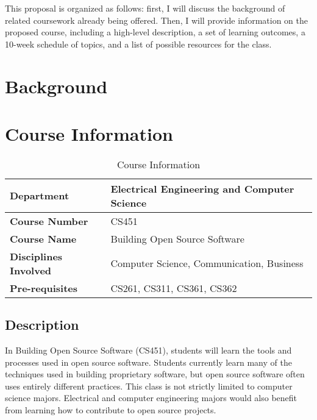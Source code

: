 \documentclass[12pt,letterpaper]{article}
\begin{document}
This proposal is organized as follows: first, I will discuss the background of
related coursework already being offered.  Then, I will provide information on
the proposed course, including a high-level description, a set of learning
outcomes, a 10-week schedule of topics, and a list of possible resources for the
class.

\section{Background}

\section{Course Information}

\begin{table}[h]
  \begin{center}
    \begin{tabular}{ | l | l | }
      \hline
      \textbf{Department}
        & Electrical Engineering and Computer Science \\ \hline
      \textbf{Course Number}
        & CS451 \\ \hline
      \textbf{Course Name}
        & Building Open Source Software\\ \hline
      \textbf{Disciplines Involved}
        & Computer Science, Communication, Business \\ \hline
      \textbf{Pre-requisites}
        & CS261, CS311, CS361, CS362 \\ \hline
    \end{tabular}
    \caption{Course Information}
  \end{center}
\end{table}

\subsection{Description}
In Building Open Source Software (CS451), students will learn the tools and
processes used in open source software.  Students currently learn many of the
techniques used in building proprietary software, but open source software often
uses entirely different practices.  This class is not strictly limited to
computer science majors.  Electrical and computer engineering majors would also
benefit from learning how to contribute to open source projects.
\end{document}
